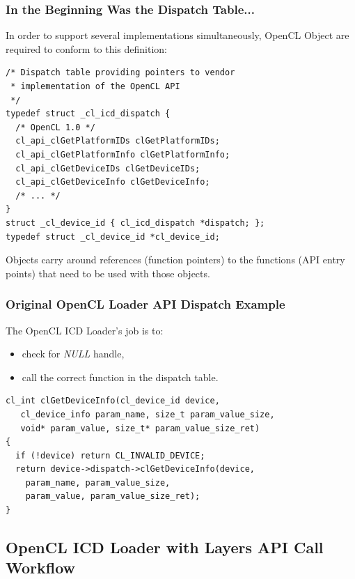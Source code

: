 \documentclass{beamer}
\begin{document}
\begin{frame}[fragile]
  \frametitle{In the Beginning Was the Dispatch Table...}
  In order to support several implementations simultaneously, OpenCL Object are
  required to conform to this definition:
  \lstset{style=CStyle}
  \begin{lstlisting}
/* Dispatch table providing pointers to vendor
 * implementation of the OpenCL API
 */
typedef struct _cl_icd_dispatch {
  /* OpenCL 1.0 */
  cl_api_clGetPlatformIDs clGetPlatformIDs;
  cl_api_clGetPlatformInfo clGetPlatformInfo;
  cl_api_clGetDeviceIDs clGetDeviceIDs;
  cl_api_clGetDeviceInfo clGetDeviceInfo;
  /* ... */
}
struct _cl_device_id { cl_icd_dispatch *dispatch; };
typedef struct _cl_device_id *cl_device_id;
\end{lstlisting}
  Objects carry around references (function pointers) to the functions (API
  entry points) that need to be used with those objects.
\end{frame}

\begin{frame}[fragile]
  \frametitle{Original OpenCL Loader API Dispatch Example}
  The OpenCL ICD Loader's job is to:
  \begin{itemize}
    \item check for \textit{NULL} handle,
    \item call the correct function in the dispatch table.
  \end{itemize}
  \lstset{style=CStyle}
  \begin{lstlisting}
cl_int clGetDeviceInfo(cl_device_id device,
   cl_device_info param_name, size_t param_value_size,
   void* param_value, size_t* param_value_size_ret)
{
  if (!device) return CL_INVALID_DEVICE;
  return device->dispatch->clGetDeviceInfo(device,
    param_name, param_value_size,
    param_value, param_value_size_ret);
}
  \end{lstlisting}
\end{frame}

\subsection[Layer API Call]{OpenCL ICD Loader with Layers API Call Workflow}

\end{document}
